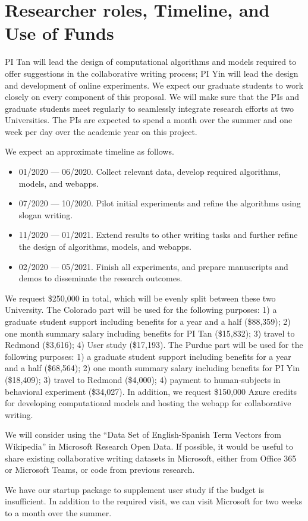 
\section{Researcher roles, Timeline, and Use of Funds}

PI Tan will lead the design of computational algorithms and models required to offer suggestions in the collaborative writing process;
PI Yin will lead the design and development of online experiments.
We expect our graduate students to work closely on every component of this proposal.
We will make sure that the PIs and graduate students meet regularly to seamlessly integrate research efforts at two Universities.
The PIs are expected to spend a month over the summer and one week per day over the academic year on this project.


 We expect an approximate timeline as follows.

\begin{itemize}[leftmargin=*,noitemsep,topsep=0pt,parsep=0pt,partopsep=0pt]
    \item 01/2020 --- 06/2020. Collect relevant data, develop required algorithms, models, and webapps.
    \item 07/2020 --- 10/2020. Pilot initial experiments and refine the algorithms using slogan writing.
    \item 11/2020 --- 01/2021. Extend results to other writing tasks and further refine the design of algorithms, models, and webapps.
    \item 02/2020 --- 05/2021. Finish all experiments, and prepare manuscripts and demos to disseminate the research outcomes.
\end{itemize}

 We request \$250,000 in total, which will be evenly split between these two University.
The Colorado part will be used for the following purposes:
1) a graduate student support including benefits for a year and a half (\$88,359);
2) one month summary salary including benefits for PI Tan (\$15,832);
3) travel to Redmond (\$3,616);
4) User study (\$17,193).
The Purdue part will be used for the following purposes:
1) a graduate student support including benefits for a year and a half (\$68,564);
2) one month summary salary including benefits for PI Yin (\$18,409);
3) travel to Redmond (\$4,000);
4) payment to human-subjects in behavioral experiment (\$34,027).
In addition, we request \$150,000 Azure credits for developing computational models and hosting the webapp for collaborative writing.


 We will consider using the ``Data Set of English-Spanish Term Vectors from Wikipedia'' in Microsoft Research Open Data. 
If possible, it would be useful to share existing collaborative writing datasets in Microsoft, either from Office 365 or Microsoft Teams, or code from previous research.

We have our startup package to supplement user study if the budget is insufficient.
In addition to the required visit, we can visit Microsoft for two weeks to a month over the summer.

